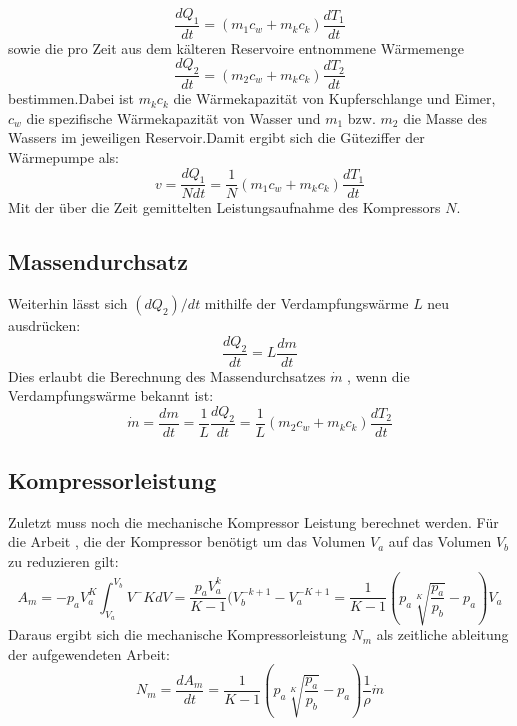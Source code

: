 \begin{equation}
\frac{dQ_1}{dt}=(m_1c_w+m_kc_k)\frac{dT_1}{dt}
\end{equation}
sowie die pro Zeit aus dem kälteren Reservoire entnommene Wärmemenge
\begin{equation}
\frac{dQ_2}{dt}=(m_2c_w+m_kc_k)\frac{dT_2}{dt}
\end{equation}
bestimmen.Dabei ist $m_k c_k$ die Wärmekapazität von Kupferschlange und Eimer, $c_w$ die spezifische Wärmekapazität von Wasser und $m_1$ bzw. $m_2$ die Masse des Wassers im jeweiligen Reservoir.Damit ergibt sich die Güteziffer der Wärmepumpe als:
\begin{equation}
v=\frac{dQ_1}{Ndt}=\frac{1}{N}(m_1c_w+m_kc_k)\frac{dT_1}{dt}
\end{equation}
Mit der über die Zeit gemittelten Leistungsaufnahme des Kompressors $N$.
\subsection{Massendurchsatz}
Weiterhin lässt sich $(dQ_2)/dt$ mithilfe der Verdampfungswärme $L$ neu ausdrücken:
\begin{equation}
\frac{dQ_2}{dt}=L\frac{dm}{dt}
\end{equation}
Dies erlaubt die Berechnung des Massendurchsatzes $\dot{m}$ , wenn die Verdampfungswärme bekannt ist:
\begin{equation}
\dot{m}=\frac{dm}{dt}=\frac{1}{L}\frac{dQ_2}{dt}=\frac{1}{L}(m_2c_w+m_kc_k)\frac{dT_2}{dt}
\end{equation}
\subsection{Kompressorleistung}
Zuletzt muss noch die mechanische Kompressor Leistung berechnet werden. Für die Arbeit , die der Kompressor benötigt um das Volumen $V_a$ auf das Volumen $V_b$ zu reduzieren gilt:
\begin{equation}
A_m=-p_aV_a^K\int_{V_a}^{V_b} V^-K dV=\frac{p_aV_a^k}{K-1}(V_b^{-k+1}-V_a^{-K+1}=\frac{1}{K-1}(p_a\sqrt[K]{\frac{p_a}{p_b}}-p_a)V_a
\end{equation}
Daraus ergibt sich die mechanische Kompressorleistung $N_m$ als zeitliche ableitung der aufgewendeten Arbeit:
\begin{equation}
N_m=\frac{dA_m}{dt}=\frac{1}{K-1}(p_a\sqrt[K]{\frac{p_a}{p_b}}-p_a)\frac{1}{\rho}\dot{m}
\end{equation}
